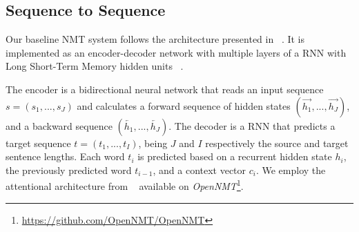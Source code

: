 \documentclass[11pt,a4paper]{article}
\begin{document}
\subsection{Sequence to Sequence}
\label{seq2seq}

Our baseline NMT system follows the architecture presented in ~. It is implemented as an encoder-decoder network with multiple layers of a RNN with Long Short-Term Memory hidden units ~\cite{DBLP:journals/corr/ZarembaSV14}.

The encoder is a bidirectional neural network that reads an input sequence $s = (s_1,...,s_J)$ and calculates a forward sequence of hidden states $(\overrightarrow{h_1}, ..., \overrightarrow{h_J})$, and a backward sequence $(\overleftarrow{h_1},..., \overleftarrow{h_J})$. The decoder is a RNN that predicts a target sequence $t = (t_1, ..., t_I)$, being $J$ and $I$ respectively the source and target sentence lengths. Each word $t_i$ is predicted based on a recurrent hidden state $h_i$, the previously predicted word $t_{i-1}$, and a context vector $c_i$. We employ the attentional architecture from ~ available on \textit{OpenNMT}\footnote{\url{https://github.com/OpenNMT/OpenNMT}}.
\end{document}
